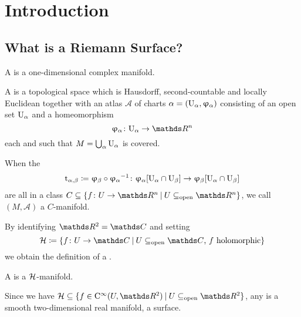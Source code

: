 \chapter{Introduction}

\section{What is a Riemann Surface?}

A \RS is a one-dimensional complex manifold.

\begin{defi}
	A  is a topological space
	which is Hausdorff, second-countable and locally Euclidean
	together with an atlas \(\mathcal A\)
	of charts \(\alpha = (\textup{U}_{\alpha}, \upvarphi_{\alpha})\)
	consisting of an open set \(\textup{U}_{\alpha}\)
	and a homeomorphism
	\[\uphi\alpha\colon \U\alpha \to \R^n\]
	each and
	such that \(M = \bigcup_\alpha \textup{U}_{\alpha}\) is covered.

	When the 
	\begin{align*}
		\textup{t}_{\alpha, \beta}
		\coloneqq \upvarphi_{\beta}\circ{\upvarphi_{\alpha}}^{-1}
		\colon
		    \upvarphi_{\alpha}[\textup{U}_{\alpha}\cap\textup{U}_{\beta}]
	        \to \upvarphi_{\beta} [\textup{U}_{\alpha}\cap\textup{U}_{\beta}]
	\end{align*}
	are all in a class
	\(C \subseteq \{f\colon U \to \R^n \:\vert\: U \subsetopen \R^n\}\),
	we call \((M, \mathcal A)\) a \(C\)-manifold.
\end{defi}

By identifying \(\R^2 = \C\)
and setting
\[\Hol \coloneqq \{f\colon U \to \C \:\vert\: \text{\(U \subsetopen \C\), \(f\) holomorphic}\}\]
we obtain the definition of a \RS.

\begin{defi}
	A  is a \(\mathcal{H}\)-manifold.
\end{defi}

\begin{rem}
	Since we have
	\(\Hol \subset \{f \in \smooth(U, \R^2) \:\vert\: U \subsetopen \R^2\}\),
	any \RS is a smooth two-dimensional real manifold,
	\ie a surface.
\end{rem}

